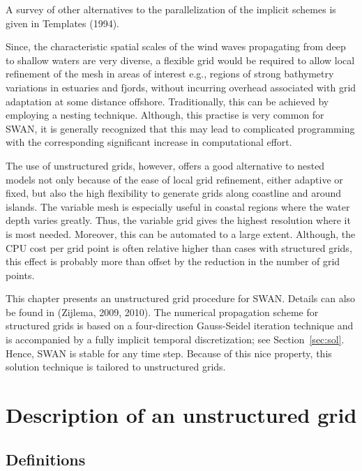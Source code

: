 \documentclass[12pt]{book}
\begin{document}
A survey of other alternatives to the parallelization of the implicit schemes is given in Templates (1994).

 \label{ch:unswan}

Since, the characteristic spatial scales of the wind waves propagating from deep to shallow waters are very
diverse, a flexible grid would be required to allow local refinement of the mesh
in areas of interest  e.g.,
regions of strong bathymetry variations in estuaries and fjords,
without incurring
overhead associated with grid adaptation at some distance offshore. Traditionally, this can be achieved by employing
a nesting technique.
Although, this practise is very common for SWAN, it is generally recognized that
this may lead to complicated programming with the corresponding significant increase in computational effort.

The use of unstructured grids, however, offers a good alternative to nested models not only because of the
ease of local grid refinement, either adaptive or fixed, but also the high flexibility to generate
grids along coastline and around islands.
The variable mesh is especially useful in coastal regions where the water depth varies greatly.
Thus, the variable grid gives the highest resolution where it is most needed.
Moreover, this can be automated to a large extent.
Although, the CPU cost per grid point is often relative higher than cases with structured grids,
this effect is probably more than offset by the reduction in the number of grid points.

This chapter presents an unstructured grid procedure for SWAN. Details can also be found in (Zijlema, 2009, 2010).
The numerical propagation scheme for structured grids is based on
a four-direction Gauss-Seidel iteration technique and is accompanied by a fully implicit temporal discretization; see Section~\ref{sec:sol}.
Hence, SWAN is stable for any time step.
Because of this nice property, this solution technique is tailored to unstructured grids.
\nocite{Zij09,Zij10}

\section{Description of an unstructured grid}
\label{sec:defunstr}

\subsection{Definitions}
\end{document}
